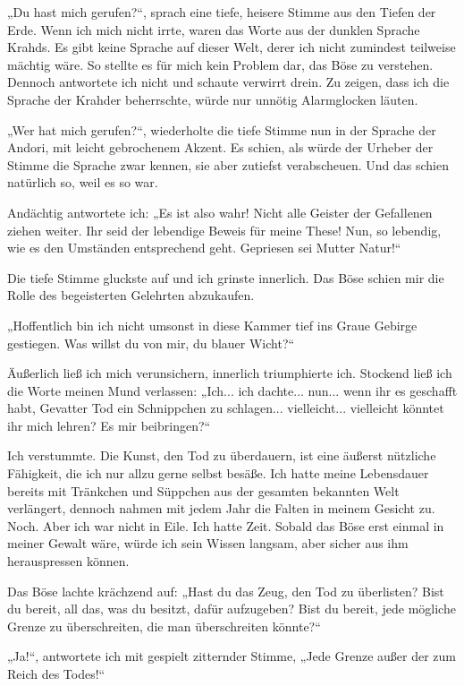„Du hast mich gerufen?“, sprach eine tiefe, heisere Stimme aus den Tiefen der Erde. Wenn ich mich nicht irrte, waren das Worte aus der dunklen Sprache Krahds. Es gibt keine Sprache auf dieser Welt, derer ich nicht zumindest teilweise mächtig wäre. So stellte es für mich kein Problem dar, das Böse zu verstehen. Dennoch antwortete ich nicht und schaute verwirrt drein. Zu zeigen, dass ich die Sprache der Krahder beherrschte, würde nur unnötig Alarmglocken läuten.

„Wer hat mich gerufen?“, wiederholte die tiefe Stimme nun in der Sprache der Andori, mit leicht gebrochenem Akzent. Es schien, als würde der Urheber der Stimme die Sprache zwar kennen, sie aber zutiefst verabscheuen. Und das schien natürlich so, weil es so war.

Andächtig antwortete ich: „Es ist also wahr! Nicht alle Geister der Gefallenen ziehen weiter. Ihr seid der lebendige Beweis für meine These! Nun, so lebendig, wie es den Umständen entsprechend geht. Gepriesen sei Mutter Natur!“

Die tiefe Stimme gluckste auf und ich grinste innerlich. Das Böse schien mir die Rolle des begeisterten Gelehrten abzukaufen.

„Hoffentlich bin ich nicht umsonst in diese Kammer tief ins Graue Gebirge gestiegen. Was willst du von mir, du blauer Wicht?“

Äußerlich ließ ich mich verunsichern, innerlich triumphierte ich. Stockend ließ ich die Worte meinen Mund verlassen: „Ich... ich dachte... nun... wenn ihr es geschafft habt, Gevatter Tod ein Schnippchen zu schlagen... vielleicht... vielleicht könntet ihr mich lehren? Es mir beibringen?“

Ich verstummte. Die Kunst, den Tod zu überdauern, ist eine äußerst nützliche Fähigkeit, die ich nur allzu gerne selbst besäße. Ich hatte meine Lebensdauer bereits mit Tränkchen und Süppchen aus der gesamten bekannten Welt verlängert, dennoch nahmen mit jedem Jahr die Falten in meinem Gesicht zu. Noch. Aber ich war nicht in Eile. Ich hatte Zeit. Sobald das Böse erst einmal in meiner Gewalt wäre, würde ich sein Wissen langsam, aber sicher aus ihm herauspressen können.

Das Böse lachte krächzend auf: „Hast du das Zeug, den Tod zu überlisten? Bist du bereit, all das, was du besitzt, dafür aufzugeben? Bist du bereit, jede mögliche Grenze zu überschreiten, die man überschreiten könnte?“

„Ja!“, antwortete ich mit gespielt zitternder Stimme, „Jede Grenze außer der zum Reich des Todes!“

